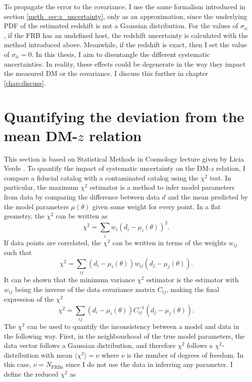 To propagate the error to the covariance, I use the same formalism introduced in section \ref{meth_sec:z_uncertainty}, only as an approximation, since the underlying PDF of the estimated redshift is not a Gaussian distribution. For the values of $\sigma_{ii}$, if the FRB has an undefined host, the redshift uncertainty is calculated with the method introduced above. Meanwhile, if the redshift is exact, then I set the value of $\sigma_{ii} = 0$. In this thesis, I aim to disentangle the different systematic uncertainties. In reality, these effects could be degenerate in the way they impact the measured DM or the covariance. I discuss this further in chapter \ref{chap:discuss}.


\section{Quantifying the deviation from the mean DM-$z$ relation}
This section is based on Statistical Methods in Cosmology lecture given by Licia Verde \citep{verde2010statistical}.
To quantify the impact of systematic uncertainty on the DM-$z$ relation, I compare a fiducial catalog with a contaminated catalog using the $\chi^2$ test. In particular, the maximum $\chi^2$ estimator is a method to infer model parameters from data by comparing the difference between data $d$ and the mean predicted by the model parameters $\mu(\theta)$ given some weight for every point. In a flat geometry, the $\chi^2$ can be written as
\begin{equation}
    \chi^2 = \sum_{i} w_i(d_i - \mu_i(\theta))^2.
\end{equation}
If data points are correlated, the $\chi^2$ can be written in terms of the weights $w_{ij}$ such that
\begin{equation}
    \chi^2 = \sum_{ij} (d_i - \mu_i(\theta))w_{ij}(d_j - \mu_j(\theta)).
\end{equation}
It can be shown that the minimum variance $\chi^2$ estimator is the estimator with $w_{ij}$ being the inverse of the data covariance matrix $C_{ij}$, making the final expression of the $\chi^2$
\begin{equation}
    \chi^2 = \sum_{ij} (d_i - \mu_i(\theta))C_{ij}^{-1}(d_j - \mu_j(\theta)).
\end{equation}
The $\chi^2$ can be used to quantify the inconsistency between a model and data in the following way. First, in the neighbourhood of the true model parameters, the data vector follows a Gaussian distribution, and therefore $\chi^2$ follows a $\chi^2$-distribution with mean $\langle \chi^2 \rangle = \nu $ where $\nu$ is the number of degrees of freedom. In this case, $\nu = N_\mathrm{FRBs}$ since I do not use the data in inferring any parameter. I define the reduced $\chi^2$ as
